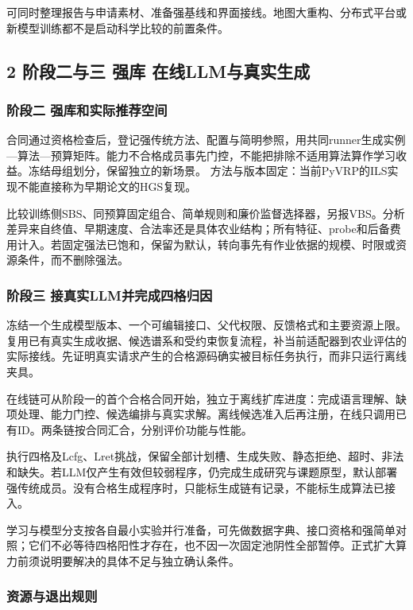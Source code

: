 \documentclass[11pt,a4paper]{article}
\newcommand{\bodytext}[1]{#1\par}
\begin{document}
\bodytext{可同时整理报告与申请素材、准备强基线和界面接线。地图大重构、分布式平台或新模型训练都不是启动科学比较的前置条件。}
\subsection{2  阶段二与三 强库 在线LLM与真实生成}
\subsubsection{阶段二 强库和实际推荐空间}
\bodytext{合同通过资格检查后，登记强传统方法、配置与简明参照，用共同runner生成实例—算法—预算矩阵。能力不合格成员事先门控，不能把排除不适用算法算作学习收益。冻结母组划分，保留独立的新场景。 方法与版本固定：当前PyVRP的ILS实现不能直接称为早期论文的HGS复现。}
\bodytext{比较训练侧SBS、同预算固定组合、简单规则和廉价监督选择器，另报VBS。分析差异来自终值、早期速度、合法率还是具体农业结构；所有特征、probe和后备费用计入。若固定强法已饱和，保留为默认，转向事先有作业依据的规模、时限或资源条件，而不删除强法。}
\subsubsection{阶段三 接真实LLM并完成四格归因}
\bodytext{冻结一个生成模型版本、一个可编辑接口、父代权限、反馈格式和主要资源上限。复用已有真实生成收据、候选谱系和受约束恢复流程，补当前适配器到农业评估的实际接线。先证明真实请求产生的合格源码确实被目标任务执行，而非只运行离线夹具。}
\bodytext{在线链可从阶段一的首个合格合同开始，独立于离线扩库进度：完成语言理解、缺项处理、能力门控、候选编排与真实求解。离线候选准入后再注册，在线只调用已有ID。两条链按合同汇合，分别评价功能与性能。}
\bodytext{执行四格及Lcfg、Lret挑战，保留全部计划槽、生成失败、静态拒绝、超时、非法和缺失。若LLM仅产生有效但较弱程序，仍完成生成研究与课题原型，默认部署强传统成员。没有合格生成程序时，只能标生成链有记录，不能标生成算法已接入。}
\bodytext{学习与模型分支按各自最小实验并行准备，可先做数据字典、接口资格和强简单对照；它们不必等待四格阳性才存在，也不因一次固定池阴性全部暂停。正式扩大算力前须说明要解决的具体不足与独立确认条件。}
\subsubsection{资源与退出规则}
\end{document}
